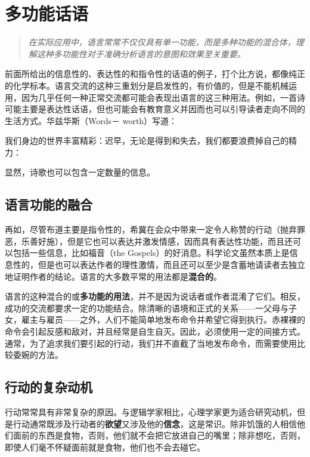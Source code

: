 \section{多功能话语}

\begin{quotation}
\textit{在实际应用中，语言常常不仅仅具有单一功能，而是多种功能的混合体，理解这种多功能性对于准确分析语言的意图和效果至关重要。}
\end{quotation}

前面所给出的信息性的、表达性的和指令性的话语的例子，打个比方说，都像纯正的化学标本。语言交流的这种三重划分是启发性的，有价值的，但是不能机械运用，因为几乎任何一种正常交流都可能会表现出语言的这三种用法。例如，一首诗可能主要是表达性话语，但也可能会有教育意义并因而也可以引导读者走向不同的生活方式。华兹华斯（Words－ worth）写道：

我们身边的世界丰富精彩：迟早，无论是得到和失去，我们都要浪费掉自己的精力：

显然，诗歌也可以包含一定数量的信息。\\

\subsection{语言功能的融合}

再如，尽管布道主要是指令性的，希冀在会众中带来一定令人称赞的行动（抛弃罪恶，乐善好施），但是它也可以表达并激发情感，因而具有表达性功能，而且还可以包括一些信息，比如福音（the Gospels）的好消息。科学论文虽然本质上是信息性的，但是也可以表达作者的理性激情，而且还可以至少是含蓄地请读者去独立地证明作者的结论。语言的大多数平常的用法都是\textbf{混合的}。

语言的这种混合的或\textbf{多功能的用法}，并不是因为说话者或作者混淆了它们。相反，成功的交流都要求一定的功能结合。除清晰的语境和正式的关系——一父母与子女，雇主与雇员——之外，人们不能简单地发布命令并希望它得到执行。赤裸裸的命令会引起反感和敌对，并且经常是自生自灭。因此，必须使用一定的间接方式。通常，为了追求我们要引起的行动，我们并不直截了当地发布命令，而需要使用比较委婉的方法。

\subsection{行动的复杂动机}

行动常常具有非常复杂的原因。与逻辑学家相比，心理学家更为适合研究动机，但是行动通常既涉及行动者的\textbf{欲望}又涉及他的\textbf{信念}，这是常识。除非饥饿的人相信他们面前的东西是食物，否则，他们就不会把它放进自己的嘴里；除非想吃，否则，即使人们毫不怀疑面前就是食物，他们也不会去碰它。


